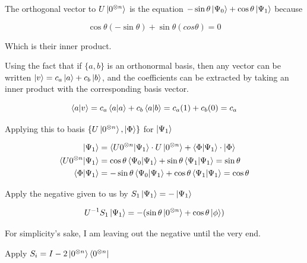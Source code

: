 \documentclass[11pt]{article}
\begin{document}
\begin{enumerate}
\begin{enumerate}
		            The orthogonal vector to $U\ket{0^{\otimes n}}$ is the equation $-\sin\theta\ket{\Psi_0} + \cos\theta\ket{\Psi_1}$ because

		            \begin{equation*}
			            \cos\theta(-\sin\theta) + \sin\theta(cos\theta) = 0
		            \end{equation*}

		            Which is their inner product.

		            Using the fact that if $\{a, b\}$ is an orthonormal basis, then any vector can be written $\ket{v} = c_a \ket{a} + c_b \ket{b}$, and the coefficients can be extracted by taking an inner product with the corresponding basis vector.

		            \begin{equation*}
			            \braket{a | v} = c_a \braket{a | a} + c_b \braket{a | b} = c_a (1) + c_b (0) = c_a
		            \end{equation*}

		            Applying this to basis $\{U\ket{0^{\otimes n}}, \ket{\Phi}\}$ for $\ket{\Psi_1}$

		            \begin{align*}
			            \ket{\Psi_1}                      & = \braket{U 0^{\otimes n} | \Psi_1}  \cdot U\ket{0^{\otimes n}} + \braket{\Phi | \Psi_1} \cdot \ket{\Phi} \\
			            \braket{U 0^{\otimes n} | \Psi_1} & = \cos\theta \braket{\Psi_0 | \Psi_1} + \sin\theta \braket{\Psi_1 | \Psi_1} = \sin\theta                  \\
			            \braket{\Phi | \Psi_1}            & = -\sin\theta\braket{\Psi_0 | \Psi_1} + \cos\theta\braket{\Psi_1 | \Psi_1} = \cos\theta
		            \end{align*}

		            Apply the negative given to us by $S_1\ket{\Psi_1} = -\ket{\Psi_1}$

		            \begin{equation*}
			            U^{-1}S_1\ket{\Psi_1} = -(\sin\theta\ket{0^{\otimes n}} + \cos\theta\ket{\phi})
		            \end{equation*}

		            For simplicity's sake, I am leaving out the negative until the very end.

		            Apply $S_i = I - 2 \ket{0^{\otimes n}}\bra{0^{\otimes n}}$


\end{enumerate}
\end{enumerate}
\end{document}
